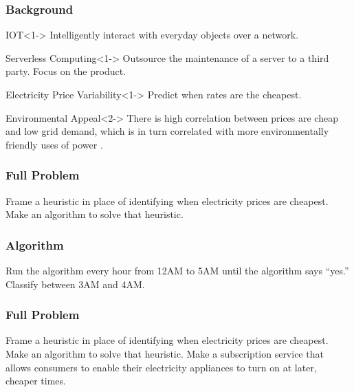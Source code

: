 \documentclass{beamer}
\begin{document}
\begin{frame}
    \frametitle{Background}
    \begin{block}{IOT}<1->
        Intelligently interact with everyday objects over a network.
    \end{block}
    \begin{block}{Serverless Computing}<1->
        Outsource the maintenance of a server to a third party. Focus on the product. 
    \end{block}
    \begin{block}{Electricity Price Variability}<1->
        Predict when rates are the cheapest. \cite{Sowers2017}
    \end{block}
    \begin{block}{Environmental Appeal}<2->
        There is high correlation between prices are cheap and low grid demand,
        which is in turn correlated with more environmentally
        friendly uses of power \cite{Mooney2015} \cite{Lombard2008}.
    \end{block}
\end{frame}

\begin{frame}
    \frametitle{Full Problem}
    \begin{outline}
         Frame a heuristic in place of identifying when electricity prices are cheapest.
         Make an algorithm to solve that heuristic.
    \end{outline}
\end{frame}

\begin{frame}
    \frametitle{Algorithm}
    \begin{outline}
         Run the algorithm every hour from 12AM to 5AM until the algorithm says ``yes.''
         Classify between 3AM and 4AM.
    \end{outline}
\end{frame}

\begin{frame}
    \frametitle{Full Problem}
    \begin{outline}
         Frame a heuristic in place of identifying when electricity prices are cheapest.
         Make an algorithm to solve that heuristic.
         Make a subscription service that allows consumers to enable their electricity
        appliances to turn on at later, cheaper times.
    \end{outline}
\end{frame}
\end{document}
